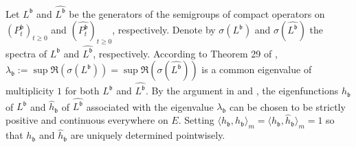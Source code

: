 \documentclass[12pt,a4paper]{amsart}
\numberwithin{equation}{section}
\theoremstyle{plain}
\theoremstyle{definition}
\theoremstyle{remark}
\begin{document}
	Let $L^\mathfrak b$ and $\widehat {L^\mathfrak b}$ be the generators of the semigroups of compact operators on $(P_t^\mathfrak b)_{t\geq 0}$ and $(\widehat
    {P_t^\mathfrak b})_{t\geq 0}$, respectively.
	Denote by $\sigma(L^\mathfrak b)$ and $\sigma(\widehat{L^\mathfrak b})$ the spectra of $L^\mathfrak b$ and $\widehat {L^{\mathfrak b}}$, respectively.
	According to Theorem 29 of \cite{Schaefer1974Banach}, $\lambda_\mathfrak b:= \sup \Re(\sigma(L^\mathfrak b)) = \sup \Re(\sigma( \widehat{L^\mathfrak b})) $
    is a common eigenvalue of multiplicity $1$ for both $L^\mathfrak b$ and $\widehat {L^{\mathfrak b}}$.
	By the argument in \cite{RenSongZhang2015Limit} and \cite{RenSongZhang2017Central}, the eigenfunctions $h_\mathfrak b$ of $L^\mathfrak b$ and $\widehat
    h_\mathfrak b$ of $\widehat{L^\mathfrak b}$ associated with the eigenvalue $\lambda_\mathfrak b$ can be chosen to be strictly positive and continuous everywhere on $E$.
	Setting $\langle h_\mathfrak b,h_\mathfrak b\rangle_m = \langle h_\mathfrak b, \widehat h_\mathfrak b\rangle_m = 1$ so that $h_\mathfrak b$ and $\widehat
    h_\mathfrak b$ are uniquely determined pointwisely.
\end{document}
